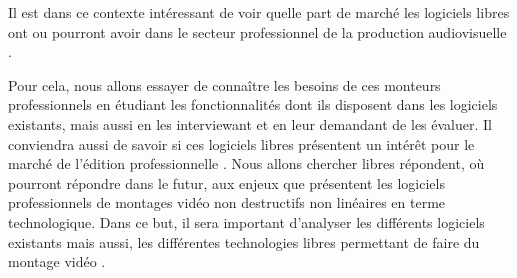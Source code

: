 Il est dans ce contexte intéressant de voir quelle part de marché les
logiciels libres ont ou pourront avoir dans le secteur professionnel de
la production audiovisuelle .

Pour cela, nous allons essayer de connaître les besoins de ces monteurs
professionnels en étudiant les fonctionnalités dont ils disposent
dans les logiciels existants, mais aussi en les interviewant et en
leur demandant de les évaluer.  Il conviendra aussi de savoir si ces
logiciels libres présentent un intérêt pour le marché de l'édition
professionnelle . Nous allons chercher %
libres répondent, où pourront répondre dans le futur, aux enjeux
que présentent les logiciels professionnels de montages vidéo non
destructifs non linéaires en terme technologique. Dans ce but, il sera
important d'analyser les différents logiciels existants mais aussi, les
différentes technologies libres permettant de faire du montage vidéo .
